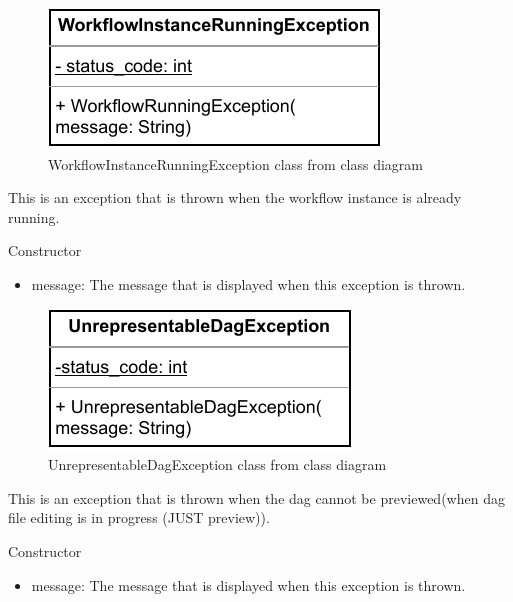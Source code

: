 
\begin{figure}[H]
    \centerline{\includegraphics[scale=1]{res/Klassen/WorkflowInstanceRunningException.pdf}}
    \caption{WorkflowInstanceRunningException class from class diagram}
\end{figure}

This is an exception that is thrown when the workflow instance is already running.
\begin{methodenv}{Constructor}

\begin{itemize}
    \item{message:}
    The message that is displayed when this exception is thrown.
\end{itemize}
\end{methodenv}


\begin{figure}[H]
    \centerline{\includegraphics[scale=1]{res/Klassen/UnrepresentableDagException.pdf}}
    \caption{UnrepresentableDagException class from class diagram}
\end{figure}

This is an exception that is thrown when the dag cannot be previewed(when dag file editing is in progress (JUST preview)).
\begin{methodenv}{Constructor}

\begin{itemize}
    \item{message:}
    The message that is displayed when this exception is thrown.
\end{itemize}
\end{methodenv}

\newpage
